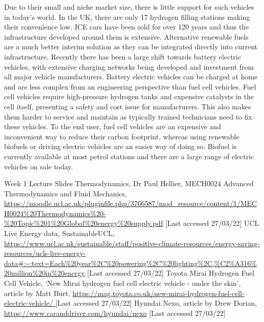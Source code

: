 \documentclass[11pt]{article}
\numberwithin{equation}{section}
\begin{document}
Due to their small and niche market size, there is little support for such vehicles in today's world. In the UK, there are only 17 hydrogen filling stations making their convenience low. ICE cars have been sold for over 120 years and thus the infrastructure developed around them is extensive. Alternative renewable fuels are a much better interim solution as they can be integrated directly into current infrastructure. Recently there has been a large shift towards battery electric vehicles, with extensive charging networks being developed and investment from all major vehicle manufacturers. Battery electric vehicles can be charged at home and are less complex from an engineering perspective than fuel cell vehicles. Fuel cell vehicles require high-pressure hydrogen tanks and expensive catalysts in the cell itself, presenting a safety and cost issue for manufacturers. This also makes them harder to service and maintain as typically trained technicians need to fix these vehicles. To the end user, fuel cell vehicles are an expensive and inconvenient way to reduce their carbon footprint, whereas using renewable biofuels or driving electric vehicles are an easier way of doing so. Biofuel is currently available at most petrol stations and there are a large range of electric vehicles on sale today.

\newpage
\begin{thebibliography}{00}
     Week 1 Lecture Slides Thermodynamics, Dr Paul Hellier, MECH0024 Advanced Thermodynamics and Fluid Mechanics, \url{https://moodle.ucl.ac.uk/pluginfile.php/3766587/mod_resource/content/1/MECH0024%20Thermodynamics%20-%20Topic%201%20Global%20energy%20supply.pdf} [Last accessed 27/03/22]
     UCL Live Energy data, SustainableUCL, \url{https://www.ucl.ac.uk/sustainable/staff/positive-climate-resources/energy-saving-resources/ucls-live-energy-data#:~:text=Each%20year%2C%20powering%2C%20lighting%2C,%C2%A316%20million%20in%20energy} [Last accessed 27/03/22]
     Toyota Mirai Hydrogen Fuel Cell Vehicle, `New Mirai hydrogen fuel cell electric vehicle - under the skin', article by Matt Burt, \url{https://mag.toyota.co.uk/new-mirai-hydrogen-fuel-cell-electric-vehicle/ } [Last accessed 27/03/22]
     Hyundai Nexo, article by Drew Dorian, \url{https://www.caranddriver.com/hyundai/nexo} [Last accessed 27/03/22]
\end{thebibliography}
\end{document}
